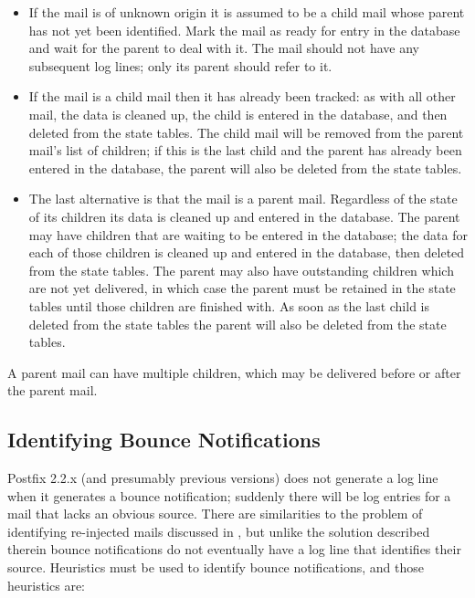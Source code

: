 \begin{itemize}

    \item If the mail is of unknown origin it is assumed to be a child mail
        whose parent has not yet been identified.  Mark the mail as ready
        for entry in the database and wait for the parent to deal with it.
        The mail should not have any subsequent log lines; only its parent
        should refer to it.

    \item If the mail is a child mail then it has already been tracked: as
        with all other mail, the data is cleaned up, the child is entered
        in the database, and then deleted from the state tables.  The child
        mail will be removed from the parent mail's list of children; if
        this is the last child and the parent has already been entered in
        the database, the parent will also be deleted from the state
        tables.

    \item The last alternative is that the mail is a parent mail.
        Regardless of the state of its children its data is cleaned up and
        entered in the database.  The parent may have children that are
        waiting to be entered in the database; the data for each of those
        children is cleaned up and entered in the database, then deleted
        from the state tables.  The parent may also have outstanding
        children which are not yet delivered, in which case the parent must
        be retained in the state tables until those children are finished
        with.  As soon as the last child is deleted from the state tables
        the parent will also be deleted from the state tables.

\end{itemize}

A parent mail can have multiple children, which may be delivered before or
after the parent mail.


\subsection{Identifying Bounce Notifications}

\label{identifying-bounce-notifications}

Postfix 2.2.x (and presumably previous versions) does not generate a log
line when it generates a bounce notification; suddenly there will be log
entries for a mail that lacks an obvious source.  There are similarities to
the problem of identifying re-injected mails discussed in
, but unlike the solution described
therein bounce notifications do not eventually have a log line that
identifies their source.  Heuristics must be used to identify bounce
notifications, and those heuristics are:

